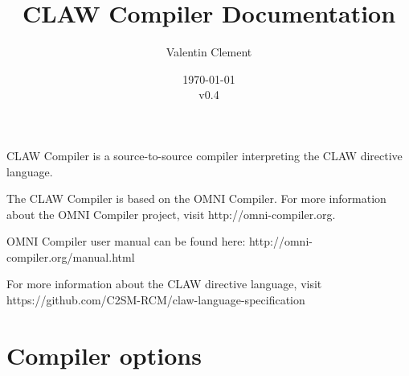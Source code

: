 \documentclass{article}
\title{CLAW Compiler Documentation}
\author{Valentin Clement}
\date{\today\\\vspace{1em}v0.4}
\begin{document}
\maketitle

CLAW Compiler is a source-to-source compiler interpreting the CLAW
directive language.

The CLAW Compiler is based on the OMNI Compiler. For more information
about the OMNI Compiler project, visit http://omni-compiler.org.

OMNI Compiler user manual can be found here: http://omni-compiler.org/manual.html

For more information about the CLAW directive language, visit
https://github.com/C2SM-RCM/claw-language-specification


\section{Compiler options}
\end{document}
